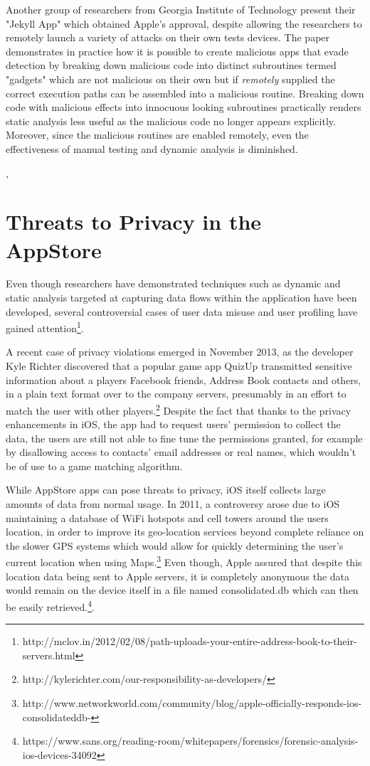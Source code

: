 \documentclass[12pt, titlepage, oneside]{article}
\begin{document}
Another group of researchers from Georgia Institute of Technology present\cite{jekyll} their "Jekyll App" which obtained Apple's approval, despite allowing the researchers to remotely launch a variety of attacks on their own tests devices. The paper demonstrates in practice how it is possible to create malicious apps that evade detection by breaking down malicious code into distinct subroutines termed "gadgets" which are not malicious on their own but if  \emph{remotely} supplied the correct execution paths can be assembled into a malicious routine. Breaking down code with malicious effects into innocuous looking subroutines practically renders static analysis less useful as the malicious code no longer appears explicitly. Moreover, since the malicious routines are enabled remotely, even the effectiveness of manual testing and dynamic analysis is diminished. 

\cite{attacks}, 
\section{Threats to Privacy in the AppStore}
Even though researchers have demonstrated techniques such as dynamic \cite{dynamic} and static \cite{pios} analysis targeted at capturing data flows within the application have been developed, several controversial cases of user data misuse and user profiling have gained attention\footnote{http://mclov.in/2012/02/08/path-uploads-your-entire-address-book-to-their-servers.html}. 

A recent case of privacy violations emerged in November 2013, as the developer Kyle Richter discovered that a popular game app QuizUp transmitted sensitive information about a players Facebook friends, Address Book contacts and others, in a plain text format over to the company servers, presumably in an effort to match the user with other players.\footnote{http://kylerichter.com/our-responsibility-as-developers/} Despite the fact that thanks to the privacy enhancements in iOS, the app had to request users' permission to collect the data, the users are still not able to fine tune the permissions granted, for example by disallowing access to contacts' email addresses or real names, which wouldn't be of use to a game matching algorithm.

While AppStore apps can pose threats to privacy, iOS itself collects large amounts of data from normal usage.
In 2011, a controversy arose due to iOS maintaining a database of WiFi hotspots and cell towers around the users location, in order to improve its geo-location services beyond complete reliance on the slower GPS systems which would allow for quickly determining the user's current location when using Maps.\footnote{http://www.networkworld.com/community/blog/apple-officially-responds-ios-consolidateddb-} Even though, Apple assured that despite this location data being sent to Apple servers, it is completely anonymous the data would remain on the device itself in a file named consolidated.db which can then be easily retrieved.\footnote{https://www.sans.org/reading-room/whitepapers/forensics/forensic-analysis-ios-devices-34092}. 
\end{document}
